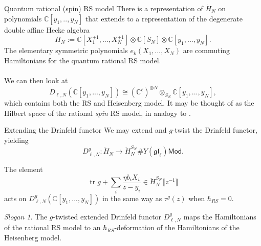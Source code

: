\documentclass[11pt]{beamer}
\theoremstyle{remark}
\theoremstyle{remark}
\newtheorem*{slogan}{Slogan}
\newcommand{\C}{\mathbb{C}}
\begin{document}
\begin{frame}{Quantum rational (spin) RS model}
There is a representation of $\dot H_N$ on polynomials $\C[y_1,..,y_N]$ that extends to a representation of the degenerate double affine Hecke algebra
\begin{equation*}
\ddot H_N := \C[X_1^{\pm 1},...,X_N^{\pm 1}] \otimes \C[S_N] \otimes \C[y_1,...,y_N].
\end{equation*}
The elementary symmetric polynomials $e_k(X_1,...,X_N)$ are commuting Hamiltonians for the quantum rational RS model.
\\~\\
We can then look at
\begin{equation*}
D_{\ell,N}(\C[y_1,...,y_N]) \cong (\C^\ell)^{\otimes N} \otimes_{S_N} \C[y_1,...,y_N],
\end{equation*}
which contains both the RS and Heisenberg model. It may be thought of as the Hilbert space of the rational \emph{spin} RS model, in analogy to \cite{article:lamers:2022}.
\end{frame}

\begin{frame}{Extending the Drinfeld functor}
We may extend and $g$-twist the Drinfeld functor, yielding
\begin{equation*}
D_{\ell,N}^g: \ddot H_N \to \ddot H_N^{S_N} \# Y(\mathfrak{gl}_\ell)\mathsf{Mod}.
\end{equation*}

\begin{theorem}
The element
\begin{equation*}
\operatorname{tr} g + \sum_i \frac{\eta b_i X_i}{z-y_i} \in \ddot H_N^{S_N}\llbracket z^{-1} \rrbracket
\end{equation*}
acts on $D_{\ell,N}^g(\C[y_1,...,y_N])$ in the same way as $\tau^g(z)$ when $\hbar_{RS} = 0$.
\end{theorem}

\begin{slogan}
The $g$-twisted extended Drinfeld functor $D_{\ell,N}^g$ maps the Hamiltonians of the rational RS model to an $\hbar_{RS}$-deformation of the Hamiltonians of the Heisenberg model.
\end{slogan}
\end{frame}
\end{document}
